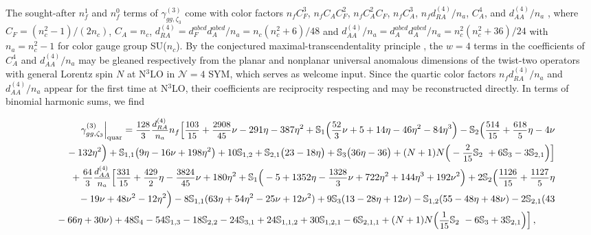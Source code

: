 \documentclass[
 twocolumn,
 superscriptaddress,
 preprintnumbers,
 nofootinbib,
 amsmath,amssymb,
 aps,
 prl
 ]{revtex4-2}
\newcommand{\BS}{\mathbb{S}}
\def\frct#1#2{\mbox{\small{$\displaystyle\frac{#1}{#2}$}}}
\begin{document}
The sought-after $n_f^1$ and $n_f^0$ terms of $\gamma_{gg,\zeta_3}^{(3)}$ come with color factors $n_fC_F^3$, $n_fC_AC_F^2$, $n_fC_A^2C_F$, $n_fC_A^3$, $n_fd_{RA}^{(4)}/n_a$, $C_A^4$, and $d_{AA}^{(4)}/n_a$ \cite{Moch:2021qrk,Moch:2023tdj,Falcioni:2024qpd,Falcioni:2025hfz}, where $C_F=(n_c^2-1)/(2n_c)$, $C_A=n_c$, $d_{RA}^{(4)}=d_F^{abcd}d_A^{abcd}/n_a=n_c(n_c^2+6)/48$ and $d_{AA}^{(4)}/n_a=d_A^{abcd}d_A^{abcd}/n_a=n_c^2(n_c^2+36)/24$ with $n_a=n_c^2-1$ for color gauge group SU($n_c$).
By the conjectured maximal-transcendentality principle \cite{Kotikov:2002ab,Kotikov:2006ts}, the $w=4$ terms in the coefficients of $C_A^4$ and $d_{AA}^{(4)}/n_a$ may be gleaned respectively from the planar \cite{Beisert:2006ez,Bajnok:2008qj} and nonplanar \cite{Kniehl:2020rip,Kniehl:2021ysp,Kniehl:2024tvd} universal anomalous dimensions of the twist-two operators with general Lorentz spin $N$ at N${}^3$LO in $\mathcal{N}=4$ SYM, which serves as welcome input.
Since the quartic color factors $n_fd_{RA}^{(4)}/n_a$ and $d_{AA}^{(4)}/n_a$ appear for the first time at N${}^3$LO, their coefficients are reciprocity respecting and may be reconstructed directly.
In terms of binomial harmonic sums, we find
\begin{widetext}
\begin{eqnarray}
&&  \gamma_{gg,\zeta_3}^{(3)}\Big|_{\mathrm{quar}}=





\frct{128}{3}\*\frct{d_{RA}^{(4)}}{n_a}\*n_f\*\Big[
\frct{103}{15}
+\frct{2908}{45}\*\nu
-291\*\eta
-387\*\eta^2
+\BS_{1}\*\Big(\frct{52}{3}\*\nu +5 + 14\*\eta - 46\*\eta ^2 - 84\*\eta ^3\Big)
-\BS_{2}\*\Big(\frct{514}{15}+\frct{618}{5}\*\eta
- 4\*\nu
\nonumber\\
&&{}
- 132\*\eta ^2\Big)
+\BS_{1,1}\*\big(9\*\eta - 16\*\nu + 198\*\eta ^2\big)
+10\*\BS_{1,2}
+\BS_{2,1}\*\big(23-18\*\eta\big)
+\BS_{3}\*\big(36\*\eta-36\big)
+(N+1)\*N\*\Big(-\frct{2}{15}\*\BS_{2}\
+6\*\BS_{3} -3\*\BS_{2,1}\Big)
\Big]
\nonumber\\
&&{}
+\frct{64}{3}\*\frct{d_{AA}^{(4)}}{n_a}\*
  \Big[
 \frct{331}{15}
+ \frct{429}{2}\*\eta
- \frct{3824}{45}\*\nu
+ 180\*\eta^2
+ \BS_{1} \*\Big(-5 + 1352\*\eta - \frct{1328}{3}\*\nu + 722\*\eta^2 + 144\*\eta^3 + 192\*\nu^2\Big)
+ 2\*\BS_{2}\*\Big(\frct{1126}{15}+\frct{1127}{5}\*\eta
\nonumber\\
&&{}
- 19\*\nu + 48\*\nu^2 - 12\*\eta^2 \Big)
- 8\*\BS_{1, 1}\*(63\*\eta + 54\*\eta^2 - 25\*\nu +12\*\nu^2)
+ 9\*\BS_{3}\*(13 - 28\*\eta + 12\*\nu)
- \BS_{1, 2}\*(55 - 48\*\eta + 48\*\nu)
- 2\*\BS_{2, 1}\*(43
\nonumber\\
&&{}
- 66\*\eta + 30\*\nu)
+ 48\*\BS_{4}
- 54\*\BS_{1, 3}
- 18\*\BS_{2, 2}
- 24\*\BS_{3, 1}
+ 24\*\BS_{1, 1, 2}
+ 30\*\BS_{1, 2, 1}
- 6\*\BS_{2, 1, 1}
+ (N+1)\*N\*\Big(\frct{1}{15}\*\BS_{2}\
-6\*\BS_{3} +3\*\BS_{2,1}\Big)
\Big]


\,,\qquad
\label{eq:quartic}
\end{eqnarray}
\end{widetext}
\end{document}
